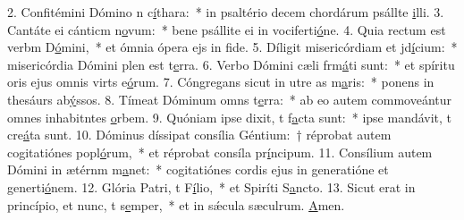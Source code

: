 2. Confitémini Dómino n c\uline{í}thara:~* in psaltério decem chordárum psállte \uline{i}lli.
3. Cantáte ei cánticm n\uline{o}vum:~* bene psállite ei in vociferti\uline{ó}ne.
4. Quia rectum est verbm D\uline{ó}mini,~* et ómnia ópera ejs in f\uline{i}de.
5. Díligit misericórdiam et jd\uline{í}cium:~* misericórdia Dómini plen est t\uline{e}rra.
6. Verbo Dómini cæli frm\uline{á}ti sunt:~* et spíritu oris ejus omnis virts e\uline{ó}rum.
7. Cóngregans sicut in utre as m\uline{a}ris:~* ponens in thesáurs ab\uline{ý}ssos.
8. Tímeat Dóminum omns t\uline{e}rra:~* ab eo autem commoveántur omnes inhabitntes \uline{o}rbem.
9. Quóniam ipse dixit, t f\uline{a}cta sunt:~* ipse mandávit, t cre\uline{á}ta sunt.
10. Dóminus díssipat consília Géntium:~† réprobat autem cogitatiónes popl\uline{ó}rum,~* et réprobat consíla pr\uline{í}ncipum.
11. Consílium autem Dómini in ætérnm m\uline{a}net:~* cogitatiónes cordis ejus in generatióne et generti\uline{ó}nem.
12. Glória Patri, t F\uline{í}lio,~* et Spiríti S\uline{a}ncto.
13. Sicut erat in princípio, et nunc, t s\uline{e}mper,~* et in sǽcula sæculrum. \uline{A}men.
